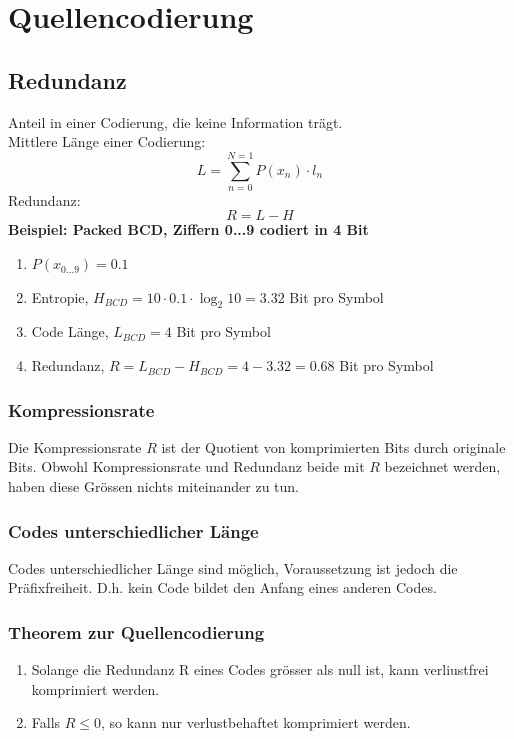 \section{Quellencodierung}
\subsection{Redundanz}
Anteil in einer Codierung, die keine Information trägt. \\
Mittlere Länge einer Codierung:
\[L= \sum_{n=0}^{N=1} P(x_n)\cdot l_n\]
Redundanz:
\[R=L-H\]
\textbf{Beispiel: Packed BCD, Ziffern 0...9 codiert in 4 Bit}
\begin{enumerate}
    \item $P(x_{0...9}) = 0.1$
    \item Entropie, $H_{BCD} = 10 \cdot 0.1 \cdot \log_{2}{10} = 3.32$ Bit pro Symbol
    \item Code Länge, $L_{BCD} = 4$ Bit pro Symbol
    \item Redundanz, $R = L_{BCD} - H_{BCD} = 4 - 3.32 = 0.68$ Bit pro Symbol
\end{enumerate}

\subsubsection{Kompressionsrate}
Die Kompressionsrate $R$ ist der Quotient von komprimierten Bits durch originale Bits. Obwohl Kompressionsrate und Redundanz beide mit $R$ bezeichnet werden, haben diese Grössen nichts miteinander zu tun.

\subsubsection{Codes unterschiedlicher Länge}
Codes unterschiedlicher Länge sind möglich, Voraussetzung ist jedoch die Präfixfreiheit. D.h. kein Code bildet den Anfang eines anderen Codes.

\subsubsection{Theorem zur Quellencodierung}
\begin{enumerate}
    \item Solange die Redundanz R eines Codes grösser als null ist, kann verliustfrei komprimiert werden.
    \item Falls $R \leq 0$, so kann nur verlustbehaftet komprimiert werden.
\end{enumerate}

